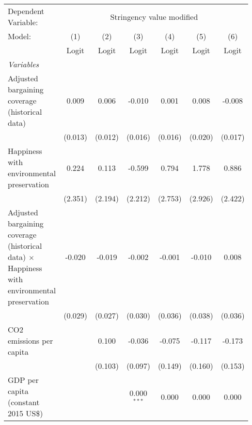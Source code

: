 
\begingroup
\centering
\begin{tabular}{lcccccc}
   \toprule
   Dependent Variable: & \multicolumn{6}{c}{Stringency value modified}\\
   Model:                                                                                             & (1)     & (2)     & (3)           & (4)     & (5)     & (6)\\  
                                                                                                      &  Logit  & Logit   & Logit         & Logit   & Logit   & Logit\\  
   \midrule
   \emph{Variables}\\
   Adjusted bargaining coverage (historical data)                                                     & 0.009   & 0.006   & -0.010        & 0.001   & 0.008   & -0.008\\   
                                                                                                      & (0.013) & (0.012) & (0.016)       & (0.016) & (0.020) & (0.017)\\   
   Happiness with environmental preservation                                                          & 0.224   & 0.113   & -0.599        & 0.794   & 1.778   & 0.886\\   
                                                                                                      & (2.351) & (2.194) & (2.212)       & (2.753) & (2.926) & (2.422)\\   
   Adjusted bargaining coverage (historical data) $\times$ Happiness with environmental preservation  & -0.020  & -0.019  & -0.002        & -0.001  & -0.010  & 0.008\\   
                                                                                                      & (0.029) & (0.027) & (0.030)       & (0.036) & (0.038) & (0.036)\\   
   CO2 emissions per capita                                                                           &         & 0.100   & -0.036        & -0.075  & -0.117  & -0.173\\   
                                                                                                      &         & (0.103) & (0.097)       & (0.149) & (0.160) & (0.153)\\   
   GDP per capita (constant 2015 US\$)                                                                &         &         & 0.000$^{***}$ & 0.000   & 0.000   & 0.000\\   

\end{tabular}
